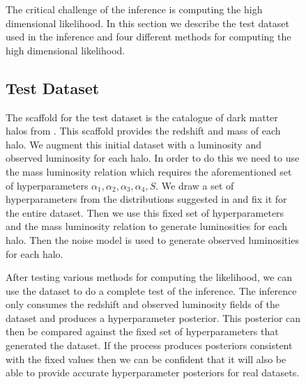 \documentclass[\docopts]{\docclass}
\begin{document}
\begin{figure}[h!]
The critical challenge of the inference is computing the high dimensional likelihood.
In this section we describe the test dataset used in the inference and four different methods for computing the high dimensional likelihood. 

\subsection{Test Dataset}
\label{subsec:testdata}

The scaffold for the test dataset is the catalogue of dark matter halos from \citealt{raytracing}.
This scaffold provides the redshift and mass of each halo.
We augment this initial dataset with a luminosity and observed luminosity for each halo.
In order to do this we need to use the mass luminosity relation which requires the aforementioned set of hyperparameters $\alpha_1, \alpha_2, \alpha_3, \alpha_4, S$. 
We draw a set of hyperparameters from the distributions suggested in \citet{reddick} and fix it for the entire dataset.
Then we use this fixed set of hyperparameters and the mass luminosity relation to generate luminosities for each halo.
Then the noise model is used to generate observed luminosities for each halo.

After testing various methods for computing the likelihood, we can use the dataset to do a complete test of the inference. 
The inference only consumes the redshift and observed luminosity fields of the dataset and produces a hyperparameter posterior.
This posterior can then be compared against the fixed set of hyperparameters that generated the dataset. 
If the process produces posteriors consistent with the fixed values then we can be confident that it will also be able to provide accurate hyperparameter posteriors for real datasets. 


\end{figure}
\end{document}
